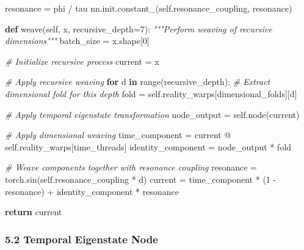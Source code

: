 \documentclass[
]{article}
\newenvironment{Shaded}{}{}
\newcommand{\BuiltInTok}[1]{\textcolor[rgb]{0.00,0.50,0.00}{#1}}
\newcommand{\CommentTok}[1]{\textcolor[rgb]{0.38,0.63,0.69}{\textit{#1}}}
\newcommand{\ControlFlowTok}[1]{\textcolor[rgb]{0.00,0.44,0.13}{\textbf{#1}}}
\newcommand{\DecValTok}[1]{\textcolor[rgb]{0.25,0.63,0.44}{#1}}
\newcommand{\KeywordTok}[1]{\textcolor[rgb]{0.00,0.44,0.13}{\textbf{#1}}}
\newcommand{\NormalTok}[1]{#1}
\newcommand{\OperatorTok}[1]{\textcolor[rgb]{0.40,0.40,0.40}{#1}}
\newcommand{\StringTok}[1]{\textcolor[rgb]{0.25,0.44,0.63}{#1}}
\newcommand{\VariableTok}[1]{\textcolor[rgb]{0.10,0.09,0.49}{#1}}
\begin{document}
\begin{Shaded}
\begin{Highlighting}[]
\NormalTok{        resonance }\OperatorTok{=}\NormalTok{ phi }\OperatorTok{/}\NormalTok{ tau}
\NormalTok{        nn.init.constant\_(}\VariableTok{self}\NormalTok{.resonance\_coupling, resonance)}

    \KeywordTok{def}\NormalTok{ weave(}\VariableTok{self}\NormalTok{, x, recursive\_depth}\OperatorTok{=}\DecValTok{7}\NormalTok{):}
        \CommentTok{"""Perform weaving of recursive dimensions"""}
\NormalTok{        batch\_size }\OperatorTok{=}\NormalTok{ x.shape[}\DecValTok{0}\NormalTok{]}

        \CommentTok{\# Initialize recursive process}
\NormalTok{        current }\OperatorTok{=}\NormalTok{ x}

        \CommentTok{\# Apply recursive weaving}
        \ControlFlowTok{for}\NormalTok{ d }\KeywordTok{in} \BuiltInTok{range}\NormalTok{(recursive\_depth):}
            \CommentTok{\# Extract dimensional fold for this depth}
\NormalTok{            fold }\OperatorTok{=} \VariableTok{self}\NormalTok{.reality\_warps[}\StringTok{\textquotesingle{}dimensional\_folds\textquotesingle{}}\NormalTok{][d]}

            \CommentTok{\# Apply temporal eigenstate transformation}
\NormalTok{            node\_output }\OperatorTok{=} \VariableTok{self}\NormalTok{.node(current)}

            \CommentTok{\# Apply dimensional weaving}
\NormalTok{            time\_component }\OperatorTok{=}\NormalTok{ current }\OperatorTok{@} \VariableTok{self}\NormalTok{.reality\_warps[}\StringTok{\textquotesingle{}time\_threads\textquotesingle{}}\NormalTok{]}
\NormalTok{            identity\_component }\OperatorTok{=}\NormalTok{ node\_output }\OperatorTok{*}\NormalTok{ fold}

            \CommentTok{\# Weave components together with resonance coupling}
\NormalTok{            resonance }\OperatorTok{=}\NormalTok{ torch.sin(}\VariableTok{self}\NormalTok{.resonance\_coupling }\OperatorTok{*}\NormalTok{ d)}
\NormalTok{            current }\OperatorTok{=}\NormalTok{ time\_component }\OperatorTok{*}\NormalTok{ (}\DecValTok{1} \OperatorTok{{-}}\NormalTok{ resonance) }\OperatorTok{+}\NormalTok{ identity\_component }\OperatorTok{*}\NormalTok{ resonance}

        \ControlFlowTok{return}\NormalTok{ current}
\end{Highlighting}
\end{Shaded}

\subsubsection{5.2 Temporal Eigenstate
Node}\label{temporal-eigenstate-node}
\end{document}

